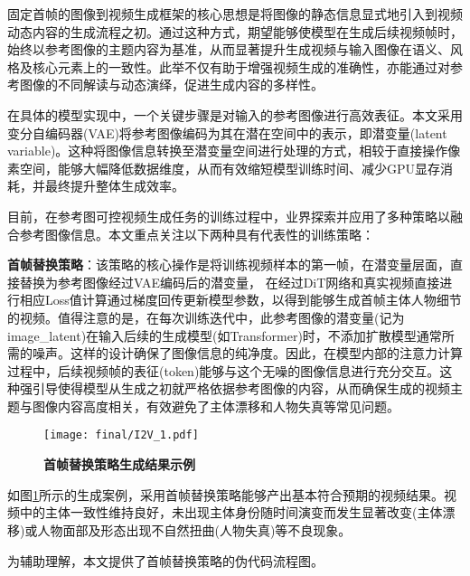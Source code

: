 固定首帧的图像到视频生成框架的核心思想是将图像的静态信息显式地引入到视频动态内容的生成流程之初。通过这种方式，期望能够使模型在生成后续视频帧时，始终以参考图像的主题内容为基准，从而显著提升生成视频与输入图像在语义、风格及核心元素上的一致性。此举不仅有助于增强视频生成的准确性，亦能通过对参考图像的不同解读与动态演绎，促进生成内容的多样性。

在具体的模型实现中，一个关键步骤是对输入的参考图像进行高效表征。本文采用变分自编码器(VAE)将参考图像编码为其在潜在空间中的表示，即潜变量(latent variable)。这种将图像信息转换至潜变量空间进行处理的方式，相较于直接操作像素空间，能够大幅降低数据维度，从而有效缩短模型训练时间、减少GPU显存消耗，并最终提升整体生成效率。

目前，在参考图可控视频生成任务的训练过程中，业界探索并应用了多种策略以融合参考图像信息。本文重点关注以下两种具有代表性的训练策略：

\textbf{首帧替换策略}：该策略的核心操作是将训练视频样本的第一帧，在潜变量层面，直接替换为参考图像经过VAE编码后的潜变量， 在经过DiT网络和真实视频直接进行相应Loss值计算通过梯度回传更新模型参数，以得到能够生成首帧主体人物细节的视频。值得注意的是，在每次训练迭代中，此参考图像的潜变量(记为 image\_latent)在输入后续的生成模型(如Transformer)时，不添加扩散模型通常所需的噪声。这样的设计确保了图像信息的纯净度。因此，在模型内部的注意力计算过程中，后续视频帧的表征(token)能够与这个无噪的图像信息进行充分交互。这种强引导使得模型从生成之初就严格依据参考图像的内容，从而确保生成的视频主题与图像内容高度相关，有效避免了主体漂移和人物失真等常见问题。
 
\begin{figure}[htbp]
    \centering
    \texttt{[image: final/I2V\_1.pdf]}
    \caption{\textbf{首帧替换策略生成结果示例}}
    \label{I2V_1}
\end{figure}

如图\ref{I2V_1}所示的生成案例，采用首帧替换策略能够产出基本符合预期的视频结果。视频中的主体一致性维持良好，未出现主体身份随时间演变而发生显著改变(主体漂移)或人物面部及形态出现不自然扭曲(人物失真)等不良现象。

为辅助理解，本文提供了首帧替换策略的伪代码流程图。

